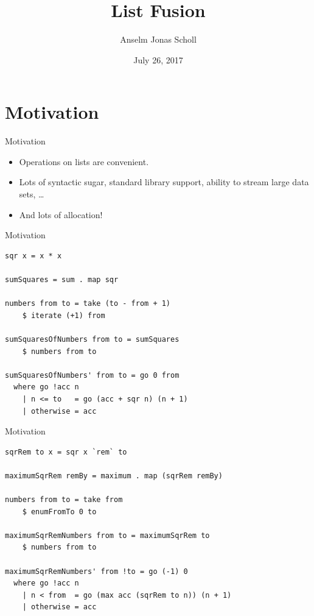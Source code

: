 \documentclass[11pt]{beamer}
\author{Anselm Jonas Scholl}
\title{List Fusion}
\institute{Hamburg Haskell Meetup}
\date{July 26, 2017}
\begin{document}
\begin{frame}
\titlepage
\end{frame}

\begin{frame}
\tableofcontents
\end{frame}

\section{Motivation}

\begin{frame}[fragile]{Motivation}
	\begin{itemize}
		\item Operations on lists are convenient.
		\item Lots of syntactic sugar, standard library support, ability to stream large data sets, \dots
		\item And lots of allocation!
	\end{itemize}
\end{frame}

\begin{frame}[fragile]{Motivation}
\begin{verbatim}
sqr x = x * x

sumSquares = sum . map sqr

numbers from to = take (to - from + 1)
    $ iterate (+1) from

sumSquaresOfNumbers from to = sumSquares
    $ numbers from to

sumSquaresOfNumbers' from to = go 0 from
  where go !acc n
    | n <= to   = go (acc + sqr n) (n + 1)
    | otherwise = acc
\end{verbatim}
\end{frame}

\begin{frame}[fragile]{Motivation}
\begin{verbatim}
sqrRem to x = sqr x `rem` to

maximumSqrRem remBy = maximum . map (sqrRem remBy)

numbers from to = take from
    $ enumFromTo 0 to

maximumSqrRemNumbers from to = maximumSqrRem to
    $ numbers from to

maximumSqrRemNumbers' from !to = go (-1) 0
  where go !acc n
    | n < from  = go (max acc (sqrRem to n)) (n + 1)
    | otherwise = acc
\end{verbatim}

\end{frame}
\end{document}
